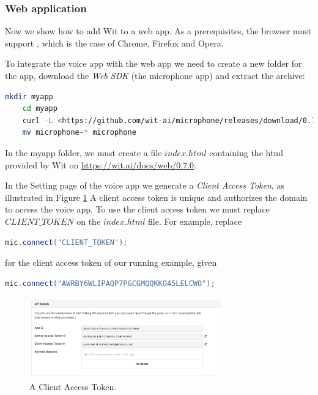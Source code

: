\subsubsection{Web application}
\label{sec:web}

Now we show how to add Wit to a web app.
As a prerequisites, the browser must support \cite{webrtc}, which is the case of Chrome, Firefox and Opera.

To integrate the voice app with the web app we need to create a new folder for the app, download the \emph{Web SDK} (the microphone app) and extract the archive:
\begin{lstlisting}[language=bash]
	mkdir myapp
	cd myapp
	curl -L <https://github.com/wit-ai/microphone/releases/download/0.7.0/microphone-0.7.0.tar.gz | tar xvzf -
	mv microphone-* microphone
\end{lstlisting}

In the myapp folder, we must create a file $index.html$ containing the html provided by Wit on \url{https://wit.ai/docs/web/0.7.0}.

In the Setting page of the voice app we generate a \emph{Client Access Token}, as illustrated in Figure \ref{fig:token} 
A client access token is unique and authorizes the domain to access the voice app. 
To use the client access token we must replace $CLIENT\_TOKEN$ on the $index.html$ file.
For example, replace 
\begin{lstlisting}[language=java]
	mic.connect("CLIENT_TOKEN");
\end{lstlisting}
for the client access token of our running example, given
\begin{lstlisting}[language=java]
	mic.connect("AWRBY6WLIPAQP7PGCGMQQKKO45LELCWO");
\end{lstlisting}

\begin{figure}[!h]
\begin{center}
    \includegraphics[width=0.75\textwidth]{figures/token.png}
    \caption{A Client Access Token.}
    \label{fig:token}
\end{center}
\end{figure}


